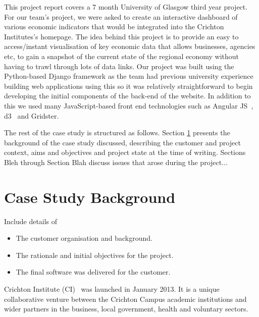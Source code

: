 \documentclass{l3proj}
\begin{document}
This project report covers a 7 month University of Glasgow third year project. For
our team's project, we were asked to create an interactive dashboard of various
economic indicators that would be integrated into the Crichton Institutes's homepage. The idea behind this project is to provide an easy to access/instant
visualisation of key economic data that allows businesses, agencies etc, to gain a snapshot of the current state of the
regional economy without having to trawl through lots of data links. Our project was built using the Python-based Django
framework as the team had previous university experience building web applications using this so it was relatively
straightforward to begin developing the initial components of the back-end of the website. In addition to this we used
many JavaScript-based front end technologies such as Angular JS~\cite{AngularWebpage}, d3~\cite{d3Webpage} and Gridster.




The rest of the case study is structured as follows.  Section
\ref{sec:background} presents the background of the case study
discussed, describing the customer and project context, aims and
objectives and project state at the time of writing.  Sections
Bleh through Section Blah discuss issues that
arose during the project...

\section{Case Study Background} \label{sec:background}

Include details of

\begin{itemize}
\item The customer organisation and background.
\item The rationale and initial objectives for the project.
\item The final software was delivered for the customer.
\end{itemize}


Crichton Institute (CI)~\cite{CrichtonInstitute} was launched in January 2013. It is a unique collaborative venture between the Crichton Campus academic
institutions and wider partners in the business, local government, health and voluntary sectors.
\end{document}
